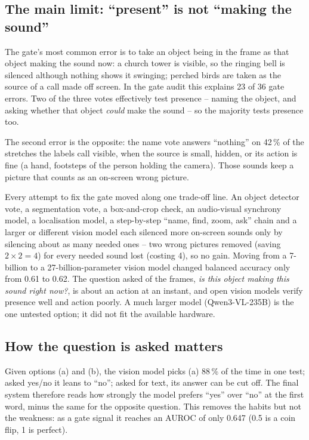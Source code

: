 \subsection{The main limit: ``present'' is not ``making the sound''}\label{sec:presence}
The gate's most common error is to take an object being in the frame as that object making the sound now: a church
tower is visible, so the ringing bell is silenced although nothing shows it swinging; perched birds are taken as the
source of a call made off screen. In the gate audit this explains 23 of 36 gate errors. Two of the three votes
effectively test presence -- naming the object, and asking whether that object \emph{could} make the sound -- so the
majority tests presence too.

The second error is the opposite: the name vote answers ``nothing'' on 42\,\% of the stretches the labels call visible,
when the source is small, hidden, or its action is fine (a hand, footsteps of the person holding the camera). Those
sounds keep a picture that counts as an on-screen wrong picture.

Every attempt to fix the gate moved along one trade-off line. An object detector vote, a segmentation vote, a box-and-crop
check, an audio-visual synchrony model, a localisation model, a step-by-step ``name, find, zoom, ask'' chain and a
larger or different vision model each silenced more on-screen sounds only by silencing about as many needed ones -- two
wrong pictures removed (saving $2 \times 2 = 4$) for every needed sound lost (costing 4), so no gain. Moving from a
7-billion to a 27-billion-parameter vision model changed balanced accuracy only from 0.61 to 0.62. The question asked of
the frames, \emph{is this object making this sound right now?}, is about an action at an instant, and open vision models
verify presence well and action poorly. A much larger model (Qwen3-VL-235B) is the one untested option; it did not fit
the available hardware.

\subsection{How the question is asked matters}
Given options (a) and (b), the vision model picks (a) 88\,\% of the time in one test; asked yes/no it leans to ``no'';
asked for text, its answer can be cut off. The final system therefore reads how strongly the model prefers ``yes'' over
``no'' at the first word, minus the same for the opposite question. This removes the habits but not the weakness: as a
gate signal it reaches an AUROC of only 0.647 (0.5 is a coin flip, 1 is perfect).

